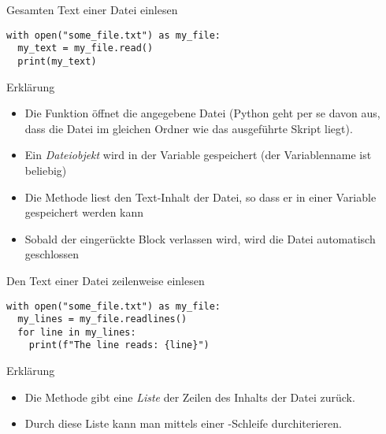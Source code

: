 \begin{fragile}
\begin{block}{Gesamten Text einer Datei einlesen}
\vspace{2pt}
\pause 
\begin{verbatim}
with open("some_file.txt") as my_file:
  my_text = my_file.read()
  print(my_text)
\end{verbatim}

\pause
\vspace{12pt}

\begin{exampleblock}{Erklärung}
\vspace{2pt}
\begin{itemize}[<+->]
	\item Die Funktion  öffnet die angegebene Datei (Python geht per se davon aus, dass die Datei im gleichen Ordner wie das ausgeführte Skript liegt).
	\item Ein \emph{Dateiobjekt} wird in der Variable  gespeichert (der Variablenname ist beliebig)
	\item Die Methode  liest den Text-Inhalt der Datei, so dass er in einer Variable gespeichert werden kann 
	\item Sobald der eingerückte Block verlassen wird, wird die Datei automatisch geschlossen
\end{itemize}
\end{exampleblock}

\end{block}
\end{fragile}

\begin{fragile}
\begin{block}{Den Text einer Datei zeilenweise einlesen}
\pause 
\vspace{2pt}

\begin{verbatim}
with open("some_file.txt") as my_file:
  my_lines = my_file.readlines()
  for line in my_lines:
    print(f"The line reads: {line}")
\end{verbatim}

\pause
\vspace{12pt}

\begin{exampleblock}{Erklärung}
\vspace{2pt}
\begin{itemize}[<+->]
\item Die Methode  gibt eine \emph{Liste} der Zeilen des Inhalts der Datei  zurück. 
\item Durch diese Liste kann man mittels einer -Schleife durchiterieren. 
\end{itemize}
\end{exampleblock}
\end{block}


\end{fragile}



